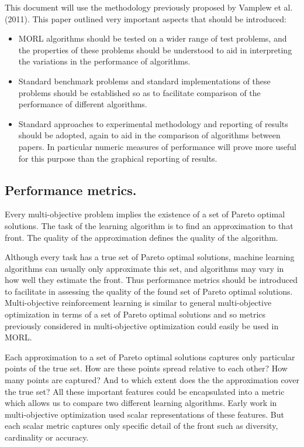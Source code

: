This document will use the methodology previously proposed by Vamplew et al. (2011)\nocite{vamplew2011empirical}. This paper outlined very important aspects that should be introduced:
\begin{itemize}
  \item MORL algorithms should be tested on a wider range of test problems, and the properties of these problems should be understood to aid in interpreting the variations in the performance of algorithms.
  \item Standard benchmark problems and standard implementations of these problems should be established so as to facilitate comparison of the performance of different algorithms.
  \item Standard approaches to experimental methodology and reporting of results should be adopted, again to aid in the comparison of algorithms between papers. In particular numeric measures of performance will prove more useful for this purpose than the graphical reporting of results.
\end{itemize}

\subsection{Performance metrics.}
\label{sec:performance-metrics}
Every multi-objective problem implies the existence of a set of Pareto optimal solutions. The task of the learning algorithm is to find an approximation to that front. The quality of the approximation defines the quality of the algorithm.

Although every task has a true set of Pareto optimal solutions, machine learning algorithms can usually only approximate this set, and algorithms may vary in how well they estimate the front. Thus performance metrics should be introduced to facilitate in assessing the quality of the found set of Pareto optimal solutions.  Multi-objective reinforcement learning is similar to general multi-objective optimization in terms of a set of Pareto optimal solutions and so metrics previously considered in multi-objective optimization could easily be used in MORL.

Each approximation to a set of Pareto optimal solutions captures only particular points of the true set. How are these points spread relative to each other? How many points are captured? And to which extent does the the approximation cover the true set? All these important features could be encapsulated into a metric which allows us to compare two different learning algorithms. Early work in multi-objective optimization used scalar representations of these features. But each scalar metric captures only specific detail of the front such as diversity, cardinality or accuracy.

